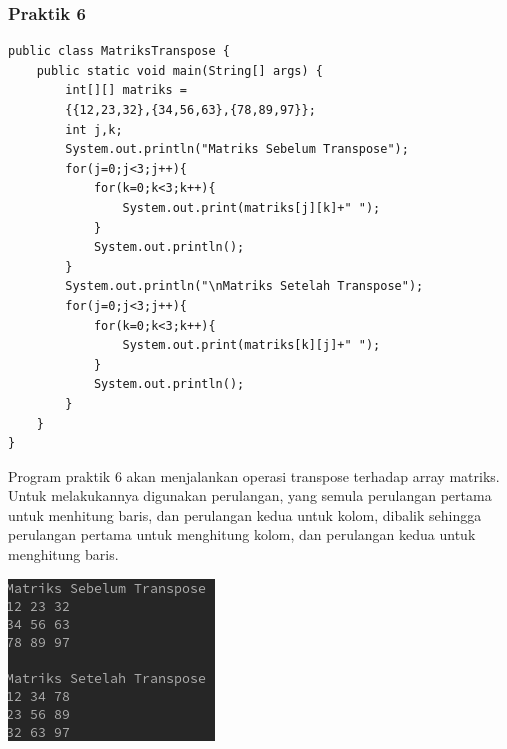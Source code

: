 \documentclass[a4paper,12pt]{article}
\begin{document}
\subsubsection{Praktik 6}
\begin{lstlisting}
public class MatriksTranspose {
    public static void main(String[] args) {
        int[][] matriks =
        {{12,23,32},{34,56,63},{78,89,97}};
        int j,k;
        System.out.println("Matriks Sebelum Transpose");
        for(j=0;j<3;j++){
            for(k=0;k<3;k++){
                System.out.print(matriks[j][k]+" ");
            }
            System.out.println();
        }
        System.out.println("\nMatriks Setelah Transpose");
        for(j=0;j<3;j++){
            for(k=0;k<3;k++){
                System.out.print(matriks[k][j]+" ");
            }
            System.out.println();
        }
    }
}
\end{lstlisting}
Program praktik 6 akan menjalankan operasi transpose terhadap array matriks. Untuk melakukannya digunakan perulangan, yang semula perulangan pertama untuk 
menhitung baris, dan perulangan kedua untuk kolom, dibalik sehingga perulangan pertama untuk menghitung kolom, dan perulangan kedua untuk menghitung baris.
\begin{center}
    \includegraphics{6.png}
\end{center}
\end{document}
